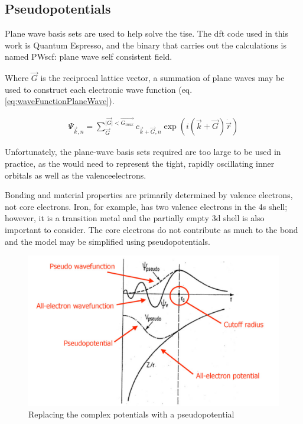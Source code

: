  
\subsection{Pseudopotentials}
\label{section:backgroundpseudopotentials}

Plane wave basis sets are used to help solve the \acrshort{tise}.  The \acrshort{dft} code used in this work is Quantum Espresso, and the binary that carries out the calculations is named PWscf: plane wave self consistent field. 

Where $\vec{G}$ is the reciprocal lattice vector, a summation of plane waves may be used to construct each electronic wave function (eq. \ref{eq:waveFunctionPlaneWave})\cite{paynedftreview}.

\begin{equation}
  \begin{split}
  \Psi_{\vec{k}, n} = \sum_{\vec{G}}^{\lvert \vec{G} \rvert < \vec{G_{max}}} c_{\vec{k} + \vec{G}, n} \exp(i(\vec{k} + \vec{G}) \dot \vec{r})
  \end{split}
  \label{eq:waveFunctionPlaneWave}
\end{equation}

Unfortunately, the plane-wave basis sets required are too large to be used in practice, as the would need to represent the tight, rapidly oscillating inner orbitals as well as the \gls{valenceelectron}s.

Bonding and material properties are primarily determined by valence electrons, not core electrons.  Iron, for example, has two valence electrons in the 4s shell; however, it is a transition metal and the partially empty 3d shell is also important to consider.  The core electrons do not contribute as much to the bond and the model may be simplified using pseudopotentials.

\begin{figure}[!htbp]
  \begin{center}
    \includegraphics[width=.4\linewidth]{chapters/background_potential_fitting/images/pp.png}
    \caption{Replacing the complex potentials with a pseudopotential\cite{ppselloni}}
    \label{graph:pseudopotentials}
  \end{center}
\end{figure}

